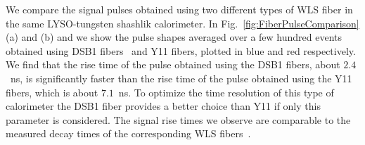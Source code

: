  We compare the signal pulses obtained using two different
 types of WLS fiber in the same LYSO-tungsten shashlik calorimeter. In
 Fig.~\ref{fig:FiberPulseComparison} (a) and (b) and we show the pulse shapes
 averaged over a few hundred events obtained using DSB1 fibers~\cite{Albrecht}
 and Y11 fibers, plotted in blue and red respectively. We find that the rise
 time of the pulse obtained using the DSB1 fibers, about $2.4$~ns, is
 significantly faster than the rise time of the pulse obtained using the Y11
 fibers, which is about $7.1$~ns. To optimize the time resolution of this type
 of calorimeter the DSB1 fiber provides a better choice than Y11 if only this
 parameter is considered. The signal rise times we observe are comparable to the
 measured decay times of the corresponding WLS fibers~\cite{Albrecht}. 
 
%

